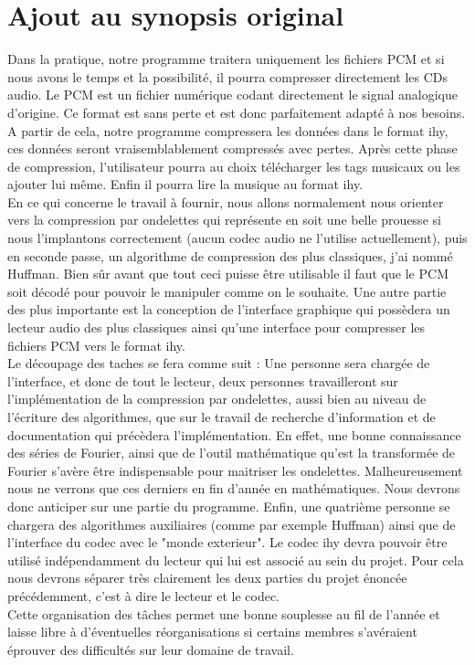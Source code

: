 \documentclass[a4paper,12pt]{article}
\begin{document}
\section*{Ajout au synopsis original}
Dans la pratique, notre programme traitera uniquement les  fichiers  PCM  et  si
nous avons le temps et la possibilité, il pourra compresser directement les  CDs
audio.	Le PCM est un fichier numérique codant directement le signal  analogique
d'origine.	Ce format est sans perte et  est  donc	parfaitement  adapté  à  nos
besoins.  A partir de cela, notre programme  compressera  les  données	dans  le
format ihy, ces données seront vraisemblablement compressés avec pertes.   Après
cette phase de compression, l'utilisateur pourra au choix télécharger  les	tags
musicaux ou les ajouter lui même.  Enfin il pourra lire  la  musique  au  format
ihy.\\ En ce qui concerne le travail à fournir,  nous  allons  normalement	nous
orienter vers la compression par ondelettes qui représente	en	soit  une  belle
prouesse si nous l'implantons  correctement  (aucun  codec	audio  ne  l'utilise
actuellement), puis en seconde passe, un  algorithme  de  compression  des	plus
classiques, j'ai nommé Huffman.  Bien  sûr	avant  que	tout  ceci	puisse	être
utilisable il faut que le PCM soit décodé pour pouvoir le manipuler comme on  le
souhaite. Une autre partie des plus importante est la conception de l'interface
graphique qui possèdera un	lecteur  audio	des  plus  classiques  ainsi  qu'une
interface pour compresser les fichiers PCM vers le format  ihy.\\  Le  découpage
des taches se fera comme suit : Une personne sera  chargée	de	l'interface,  et
donc de tout le lecteur, deux personnes travailleront sur l'implémentation de la
compression par ondelettes, aussi bien au niveau de l'écriture des	algorithmes,
que sur le travail de recherche d'information et de documentation qui  précèdera
l'implémentation. En effet, une bonne connaissance des séries de Fourier, ainsi
que de l'outil mathématique  qu'est  la  transformée  de  Fourier  s'avère	être
indispensable pour maitriser les ondelettes.  Malheureusement  nous  ne  verrons
que ces derniers en fin d'année en mathématiques.  Nous devrons  donc  anticiper
sur une partie du programme.  Enfin, une  quatrième  personne  se  chargera  des
algorithmes auxiliaires (comme par exemple Huffman) ainsi que de l'interface  du
codec avec le "monde exterieur".   Le  codec  ihy  devra  pouvoir  être  utilisé
indépendamment du lecteur qui lui est associé au sein du projet. Pour cela nous
devrons séparer très clairement les deux parties du projet énoncée précédemment,
c'est à dire le lecteur et le codec.\\ Cette organisation des tâches permet  une
bonne  souplesse  au  fil  de  l'année	 et   laisse   libre   à   d'éventuelles
réorganisations si certains membres s'avéraient  éprouver  des	difficultés  sur
leur domaine de travail.
\end{document}
